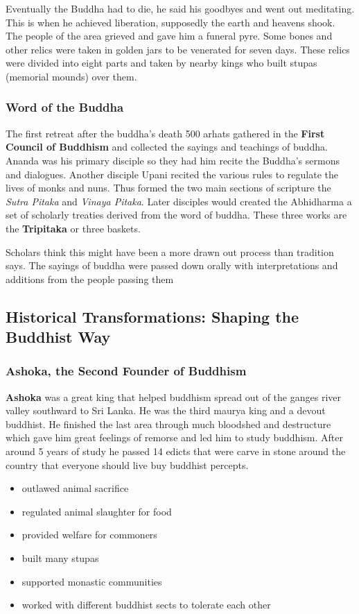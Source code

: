 \documentclass{article}
\begin{document}
Eventually the Buddha had to die, he said his goodbyes and went out meditating. This is when he achieved liberation, supposedly the earth and heavens shook. The people of the area grieved and gave him a funeral pyre. Some bones and other relics were taken in golden jars to be venerated for seven days. These relics were divided into eight parts and taken by nearby kings who built stupas (memorial mounds) over them.

\subsubsection*{Word of the Buddha}
\label{ssub:word_of_the_buddha}
The first retreat after the buddha's death 500 arhats gathered in the \textbf{First Council of Buddhism} and collected the sayings and teachings of buddha. Ananda was his primary disciple so they had him recite the Buddha's sermons and dialogues. Another disciple Upani recited the various rules to regulate the lives of monks and nuns. Thus formed the two main sections of scripture the \emph{Sutra Pitaka} and \emph{Vinaya Pitaka}. Later disciples would created the Abhidharma a set of scholarly treaties derived from the word of buddha. These three works are the \textbf{Tripitaka} or three baskets.

Scholars think this might have been a more drawn out process than tradition says. The sayings of buddha were passed down orally with interpretations and additions from the people passing them

\subsection*{Historical Transformations: Shaping the Buddhist Way}
\label{sub:historical_transformations_shaping_the_buddhist_way}
\subsubsection*{Ashoka, the Second Founder of Buddhism}
\label{ssub:ashoka_the_second_founder_of_buddhism}
\textbf{Ashoka} was a great king that helped buddhism spread out of the ganges river valley southward to Sri Lanka. He was the third maurya king and a devout buddhist. He finished the last area through much bloodshed and destructure which gave him great feelings of remorse and led him to study buddhism. After around 5 years of study he passed 14 edicts that were carve in stone around the country that everyone should live buy buddhist percepts.
\begin{itemize}
	\item outlawed animal sacrifice
	\item regulated animal slaughter for food
	\item provided welfare for commoners
	\item built many stupas
	\item supported monastic communities
	\item worked with different buddhist sects to tolerate each other
\end{itemize}
\end{document}
